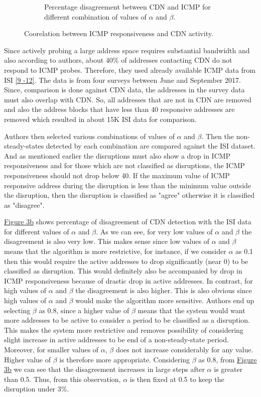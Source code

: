 \documentclass[11pt,twoside,a4paper]{article}
\begin{document}
\begin{figure}[h!]
\begin{subfigure}[b]{75mm}
    \caption{Percentage disagreement between CDN and ICMP for different combination of values of $\alpha$ and $\beta$. \newline}
  \end{subfigure}
  \caption{Coorelation between ICMP responsiveness and CDN activity.}
  \label{fig:CDNAndICMP}
\end{figure}

Since actively probing a large address space requires substantial bandwidth and also according to authors, about 40\% of addresses contacting CDN do not respond to ICMP probes. Therefore, they used already available ICMP data from ISI \hyperlink {K9} {[9 -12]}. The data is from four surveys between June and September 2017. Since, comparison is done against CDN data, the addresses in the survey data must also overlap with CDN. So, all addresses that are not in CDN are removed and also the address blocks that have less than 40 responsive addresses are removed which resulted in about 15K ISI data for comparison.  

Authors then selected various combinations of values of $\alpha$ and $\beta$. Then the non-steady-states detected by each combination are compared against the ISI dataset. And as mentioned earlier the disruptions must also show a drop in ICMP responsiveness and for those which are not classified as disruptions, the ICMP responsiveness should not drop below 40. If the maximum value of ICMP responsive address during the disruption is less than the minimum value outside the disruption, then the disruption is classified as "agree" otherwise it is classified as  "disagree".

 \hyperref[fig:CDNAndICMP]{Figure 3b} shows percentage of disagreement of CDN detection with the ISI data for different values of $\alpha$ and $\beta$. As we can see, for very low values of $\alpha$ and $\beta$ the disagreement is also very low. This makes sense since low values of $\alpha$ and $\beta$ means that the algorithm is more restrictive, for instance, if we consider $\alpha$ as 0.1 then this would require the active addresses to drop significantly (near 0) to be classified as disruption. This would definitely also be accompanied by drop in ICMP responsiveness because of drastic drop in active addresses. In contrast, for high values of $\alpha$ and $\beta$ the disagreement is also higher. This is also obvious since high values of $\alpha$ and $\beta$ would make the algorithm more sensitive. Authors end up selecting $\beta$ as 0.8, since a higher value of $\beta$ means that the system would want more addresses to be active to consider a period to be classified as a disruption. This makes the system more restrictive and removes possibility of considering slight increase in active addresses to be end of a non-steady-state period. Moreover, for smaller values of $\alpha$, $\beta$ does not increase considerably for any value. Higher value of $\beta$ is therefore more appropriate.  Considering $\beta$ as 0.8, from \hyperref[fig:CDNAndICMP]{Figure 3b} we can see that the disagreement increases in large steps after $\alpha$ is greater than 0.5. Thus, from this observation, $\alpha$ is then fixed at 0.5 to keep the disruption under 3\%.
\end{document}
